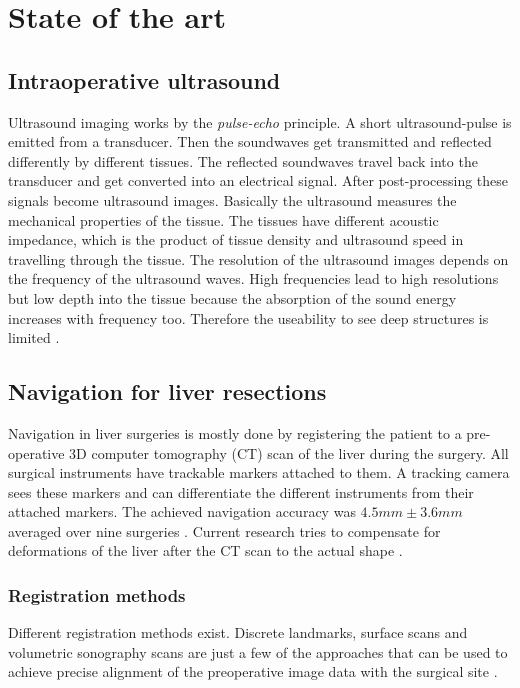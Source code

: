 \chapter{State of the art}

\section{Intraoperative ultrasound}
Ultrasound imaging works by the \textit{pulse-echo} principle. A short
ultrasound-pulse is emitted from a transducer. Then the soundwaves get
transmitted and reflected differently by different tissues. The reflected
soundwaves travel back into the transducer and get converted into an electrical
signal. After post-processing these signals become ultrasound images. Basically
the ultrasound measures the mechanical properties of the tissue. The tissues
have different acoustic impedance, which is the product of tissue density and
ultrasound speed in travelling through the tissue. The resolution of the
ultrasound images depends on the frequency of the ultrasound waves. High
frequencies lead to high resolutions but low depth into the tissue because the
absorption of the sound energy increases with frequency too. Therefore the
useability to see deep structures is limited \cite{torzilli2014ultrasound}.

\section{Navigation for liver resections}
Navigation in liver surgeries is mostly done by registering the patient to a pre-operative 3D
computer tomography (CT) scan of the liver during the surgery. All surgical
instruments have trackable markers attached to them. A tracking camera sees
these markers and can differentiate the different instruments from their attached
markers. The achieved
navigation accuracy was $4.5 mm \pm3.6 mm$ averaged over nine surgeries \cite{peterhans2011navigation}.
Current research tries to compensate for deformations of the liver after the CT
scan to the actual shape \cite{clements2017deformation}
\cite{clements2015validation}. 

\subsection{Registration methods}
Different registration methods exist. Discrete landmarks, surface scans and
volumetric sonography scans are just a few of the approaches that can be
used to achieve precise alignment of the preoperative image data with the
surgical site \cite{banz2016intraoperative}.

